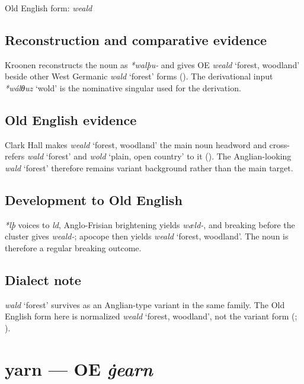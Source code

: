\documentclass[
  british,
  a4paper,
  openany]{book}
\providecommand{\Recon}[1]{\emph{*#1}}
{\catcode`→=\active \global\def→{\ensuremath{\rightarrow}}}
\providecommand{\texorpdfstring}[2]{#1}
\providecommand{\Recon}[1]{\emph{*#1}}
{\catcode`→=\active \global\def→{\ensuremath{\rightarrow}}}
\begin{document}
Old English form: \emph{weald}

\subsection{Reconstruction and comparative
evidence}\label{reconstruction-and-comparative-evidence-68}

Kroonen reconstructs the noun as \emph{*walþu-} and gives OE
{\emph{weald}} `forest, woodland' beside other West Germanic
{\emph{wald}} `forest' forms ().
The derivational input \Recon{wálθuz} `wold' is the nominative singular
used for the derivation.

\subsection{Old English evidence}\label{old-english-evidence-68}

Clark Hall makes {\emph{weald}} `forest, woodland' the main noun
headword and cross-refers {\emph{wald}} `forest' and {\emph{wold}}
`plain, open country' to it (). The Anglian-looking {\emph{wald}} `forest' therefore remains
variant background rather than the main target.

\subsection{Development to Old
English}\label{development-to-old-english-68}

\emph{*lþ} voices to \emph{ld}, Anglo-Frisian brightening yields
\emph{wæld-}, and breaking before the cluster gives \emph{weald-};
apocope then yields {\emph{weald}} `forest, woodland'. The noun is
therefore a regular breaking outcome.

\subsection{Dialect note}\label{dialect-note-6}

{\emph{wald}} `forest' survives as an Anglian-type variant in the same
family. The Old English form here is normalized {\emph{weald}} `forest,
woodland', not the variant form (; ).

\section{\texorpdfstring{yarn --- OE
\emph{ġearn}}{yarn --- OE ġearn}}\label{yarn-oe-ux121earn}
\end{document}
